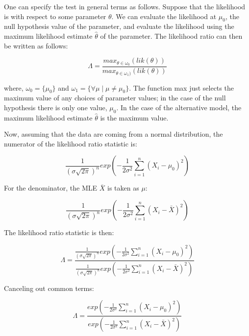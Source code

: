 \documentclass[12pt,]{krantz}
\begin{document}
One can specify the test in general terms as follows. Suppose that the likelihood is with respect to some parameter \(\theta\). We can evaluate the likelihood at \(\mu_0\), the null hypothesis value of the parameter, and evaluate the likelihood using the maximum likelihood estimate \(\hat\theta\) of the parameter. The likelihood ratio can then be written as follows:

\begin{equation}
\Lambda = \frac{max_{\theta\in \omega_0}(lik(\theta))}{max_{\theta\in \omega_1)}(lik(\theta))}
\end{equation}

where, \(\omega_0=\{\mu_0\}\) and \(\omega_1=\{\forall \mu \mid \mu\neq \mu_0\}\). The function max just selects the maximum value of any choices of parameter values; in the case of the null hypothesis there is only one value, \(\mu_0\). In the case of the alternative model, the maximum likelihood estimate \(\hat\theta\) is the maximum value.

Now, assuming that the data are coming from a normal distribution, the numerator of the likelihood ratio statistic is:

\begin{equation}
\frac{1}{(\sigma\sqrt{2\pi})^n} 
           exp\left( -\frac{1}{2\sigma^2} \sum_{i=1}^n (X_i - \mu_0)^2  \right)
\end{equation}

For the denominator, the MLE \(\bar{X}\) is taken as \(\mu\):

\begin{equation}
\frac{1}{(\sigma\sqrt{2\pi})^n} exp \left( -\frac{1}{2\sigma^2} \sum_{i=1}^n (X_i - \bar{X})^2 \right)
\end{equation}

The likelihood ratio statistic is then:

\begin{equation}
\Lambda = 
\frac{\frac{1}{(\sigma\sqrt{2\pi})^n} 
           exp\left( -\frac{1}{2\sigma^2} \sum_{i=1}^n (X_i - \mu_0)^2  \right)}{\frac{1}{(\sigma\sqrt{2\pi})^n} 
           exp\left( -\frac{1}{2\sigma^2} \sum_{i=1}^n (X_i - \bar{X})^2  \right)}
\end{equation}

Canceling out common terms:

\begin{equation}
\Lambda = 
\frac{exp\left( -\frac{1}{2\sigma^2} \sum_{i=1}^n (X_i - \mu_0)^2  \right)}{
        exp\left( -\frac{1}{2\sigma^2} \sum_{i=1}^n (X_i - \bar{X})^2  \right)}
\end{equation}
\end{document}

